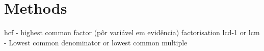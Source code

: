 \section{Methods}
\acs{hcf} - highest common factor (pôr variável em evidência) 
\emptyline
\acl{factorisation} 
\emptyline
\acs{lcd-1} or \acs{lcm} - Lowest common denominator or lowest common multiple
